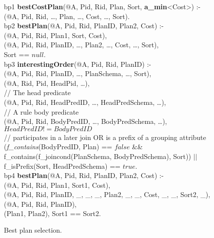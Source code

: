 \begin{figure*}
\ssp
\centering
\begin{boxedminipage}{\linewidth}
bp1 {\bf bestCostPlan}(@A, Pid, Rid, Plan, Sort, {\small \bf a\_min}<Cost>) :- \\
(@A, Pid, Rid, \ldots, Plan, \ldots, Cost, \ldots, Sort). \\

bp2 {\bf bestPlan}(@A, Pid, Rid, PlanID, Plan2, Cost) :- \\
(@A, Pid, Rid, Plan1, Sort, Cost), \\
(@A, Pid, Rid, PlanID, \ldots, Plan2, \ldots, Cost, \ldots, Sort), \\
\datalogspace Sort == $null$.\\

bp3 {\bf interestingOrder}(@A, Pid, Rid, PlanID) :- \\
(@A, Pid, Rid, PlanID, \ldots, PlanSchema, \ldots, Sort), \\
(@A, Rid, Pid, HeadPid, \ldots), \\
\datalogspace // The head predicate \\
(@A, Pid, Rid, HeadPredID, \ldots, HeadPredSchema, \ldots),\\
\datalogspace // A rule body predicate \\
(@A, Pid, Rid, BodyPredID, \ldots, BodyPredSchema, \ldots),\\
\datalogspace $HeadPredID != BodyPredID$ \\
\datalogspace // participates in a later join OR is a prefix of a grouping attribute \\ 
\datalogspace ({\em f\_contains}(BodyPredID, Plan) ==  $false$ \&\& \\
\datalogspace f\_contains(f\_joincond(PlanSchema, BodyPredSchema), Sort)) $||$ \\
\datalogspace f\_isPrefix(Sort, HeadPredSchema) ==  $true$.  \\

bp4 {\bf bestPlan}(@A, Pid, Rid, PlanID, Plan2, Cost) :- \\
(@A, Pid, Rid, Plan1, Sort1, Cost), \\
(@A, Pid, Rid, PlanID, \_, \_, \_, Plan2, \_, \_, Cost, \_, \_, Sort2, \_), \\
(@A, Pid, Rid, PlanID), \\
(Plan1, Plan2), Sort1 == Sort2.
\end{boxedminipage}
\caption{\label{ch:opt:fig:bestplan}Best plan selection.}
\end{figure*}

